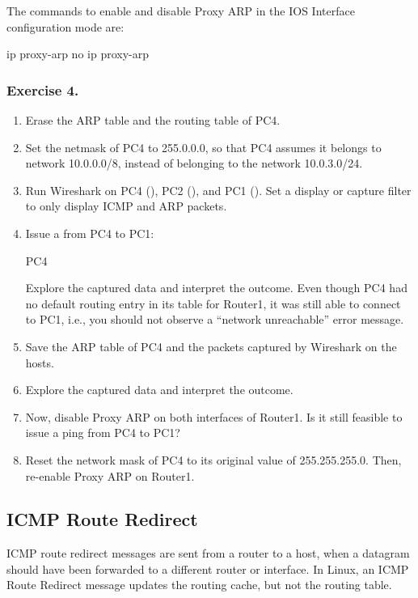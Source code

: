 The commands to enable and disable Proxy ARP in the IOS Interface configuration mode are:
\begin{cmdblock}
	ip proxy-arp
	no ip proxy-arp
\end{cmdblock}

\subsubsection*{Exercise 4.}
\begin{enumerate}
	\item Erase the ARP table and the routing table of PC4.
	\item Set the netmask of PC4 to 255.0.0.0, so that PC4 assumes it belongs to network 10.0.0.0/8, instead of belonging to the network 10.0.3.0/24.
	\item Run Wireshark on PC4 (), PC2 (), and PC1 (). Set a display or capture filter to only display ICMP and ARP packets.
	\item Issue a  from PC4 to PC1:
		\begin{cmdblock}
	PC4%
		\end{cmdblock}
		Explore the captured data and interpret the outcome.
		Even though PC4 had no default routing entry in its table for Router1, it was still able to connect to PC1, i.e., you should not observe a ``network unreachable'' error message.
	\item Save the ARP table of PC4 and the packets captured by Wireshark on the hosts.
	\item Explore the captured data and interpret the outcome.
	\item Now, disable Proxy ARP on both interfaces of Router1. Is it still feasible to issue a ping from PC4 to PC1?
	\item Reset the network mask of PC4 to its original value of 255.255.255.0. Then, re-enable Proxy ARP on Router1.
\end{enumerate}

\begin{questions}
\end{questions}

\newpage
\subsection{ICMP Route Redirect}
ICMP route redirect messages are sent from a router to a host, when a datagram should have been forwarded to a different router or interface. In Linux, an ICMP Route Redirect message updates the routing cache, but not the routing table.

